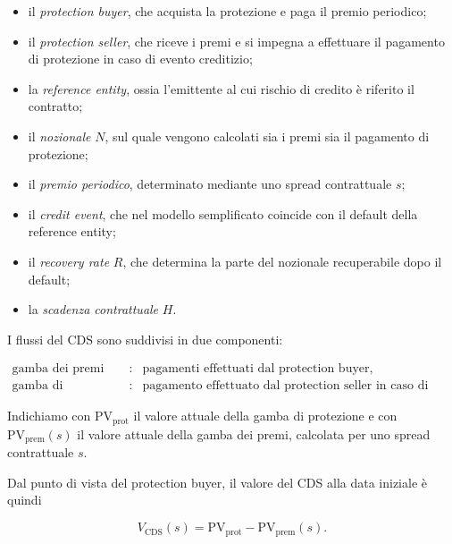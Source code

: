 \begin{itemize}

\item il \emph{protection buyer}, che acquista la protezione e paga il
premio periodico;

\item il \emph{protection seller}, che riceve i premi e si impegna a
effettuare il pagamento di protezione in caso di evento creditizio;

\item la \emph{reference entity}, ossia l'emittente al cui rischio di
credito \`{e} riferito il contratto;

\item il \emph{nozionale} $N$, sul quale vengono calcolati sia i premi sia il
pagamento di protezione;

\item il \emph{premio periodico}, determinato mediante uno spread contrattuale
$s$;

\item il \emph{credit event}, che nel modello semplificato coincide con
il default della reference entity;

\item il \emph{recovery rate} $R$, che determina la parte del nozionale
recuperabile dopo il default;

\item la \emph{scadenza contrattuale} $H$.

\end{itemize}

I flussi del CDS sono suddivisi in due componenti:

\[
\begin{array}{ccl}
\text{gamba dei premi}
&
:
&
\text{pagamenti effettuati dal protection buyer,}
\\[2mm]
\text{gamba di protezione}
&
:
&
\text{pagamento effettuato dal protection seller in caso di default.}
\end{array}
\]

Indichiamo con $\mathrm{PV}_{\mathrm{prot}}$ il valore attuale della
gamba di protezione e con $\mathrm{PV}_{\mathrm{prem}}(s)$ il valore
attuale della gamba dei premi, calcolata per uno spread contrattuale
$s$.

Dal punto di vista del protection buyer, il valore del CDS alla data
iniziale \`{e} quindi

\[
V_{\mathrm{CDS}}(s)
=
\mathrm{PV}_{\mathrm{prot}}
-
\mathrm{PV}_{\mathrm{prem}}(s).
\]

